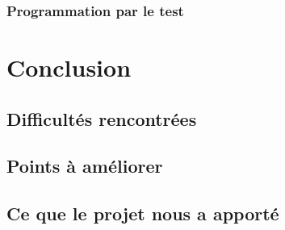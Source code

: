 \documentclass[10pt,a4paper,oneside]{report}
\begin{document}
\subsection{Programmation par le test}


\chapter{Conclusion}

\section{Difficultés rencontrées}

\section{Points à améliorer}

\section{Ce que le projet nous a apporté}

\end{document}
